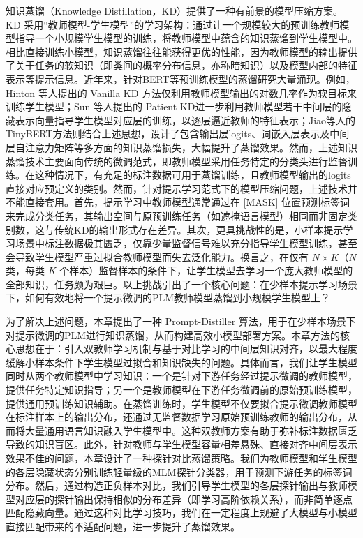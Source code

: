 \documentclass[../main.tex]{subfiles}
\begin{document}
知识蒸馏（Knowledge Distillation，KD）提供了一种有前景的模型压缩方案。KD 采用“教师模型-学生模型”的学习架构：通过让一个规模较大的预训练教师模型指导一个小规模学生模型的训练，将教师模型中蕴含的知识蒸馏到学生模型中。相比直接训练小模型，知识蒸馏往往能获得更优的性能，因为教师模型的输出提供了关于任务的软知识（即类间的概率分布信息，亦称暗知识）以及模型内部的特征表示等提示信息。近年来，针对BERT等预训练模型的蒸馏研究大量涌现。例如， Hinton 等人提出的 Vanilla KD 方法仅利用教师模型输出的对数几率作为软目标来训练学生模型；Sun 等人提出的 Patient KD进一步利用教师模型若干中间层的隐藏表示向量指导学生模型对应层的训练，以逐层逼近教师的特征表示；Jiao等人的TinyBERT方法则结合上述思想，设计了包含输出层logits、词嵌入层表示及中间层自注意力矩阵等多方面的知识蒸馏损失，大幅提升了蒸馏效果。然而，上述知识蒸馏技术主要面向传统的微调范式，即教师模型采用任务特定的分类头进行监督训练。在这种情况下，有充足的标注数据可用于蒸馏训练，且教师模型输出的logits直接对应预定义的类别。然而，针对提示学习范式下的模型压缩问题，上述技术并不能直接套用。首先，提示学习中教师模型通常通过在 [MASK] 位置预测标签词来完成分类任务，其输出空间与原预训练任务（如遮掩语言模型）相同而非固定类别数，这与传统KD的输出形式存在差异。其次，更具挑战性的是，小样本提示学习场景中标注数据极其匮乏，仅靠少量监督信号难以充分指导学生模型训练，甚至会导致学生模型严重过拟合教师模型而失去泛化能力。换言之，在仅有 $N\times K$（$N$ 类，每类 $K$ 个样本）监督样本的条件下，让学生模型去学习一个庞大教师模型的全部知识，任务颇为艰巨。以上挑战引出了一个核心问题：在少样本提示学习场景下，如何有效地将一个提示微调的PLM教师模型蒸馏到小规模学生模型上？

为了解决上述问题，本章提出了一种 Prompt-Distiller 算法，用于在少样本场景下对提示微调的PLM进行知识蒸馏，从而构建高效小模型部署方案。本章方法的核心思想在于：引入双教师学习机制与基于对比学习的中间层知识对齐，以最大程度缓解小样本条件下学生模型过拟合和知识缺失的问题。具体而言，我们让学生模型同时从两个教师模型中学习知识：一个是针对下游任务经过提示微调的教师模型，提供任务特定知识指导；另一个是教师模型在下游任务微调前的原始预训练模型，提供通用预训练知识辅助。在蒸馏训练时，学生模型不仅要拟合提示微调教师模型在标注样本上的输出分布，还通过无监督数据学习原始预训练教师的输出分布，从而将大量通用语言知识融入学生模型中。这种双教师方案有助于弥补标注数据匮乏导致的知识盲区。此外，针对教师与学生模型容量相差悬殊、直接对齐中间层表示效果不佳的问题，本章设计了一种探针对比蒸馏策略。我们为教师模型和学生模型的各层隐藏状态分别训练轻量级的MLM探针分类器，用于预测下游任务的标签词分布。然后，通过构造正负样本对比，我们引导学生模型的各层探针输出与教师模型对应层的探针输出保持相似的分布差异（即学习高阶依赖关系），而非简单逐点匹配隐藏向量。通过这种对比学习技巧，我们在一定程度上规避了大模型与小模型直接匹配带来的不适配问题，进一步提升了蒸馏效果。
\end{document}
